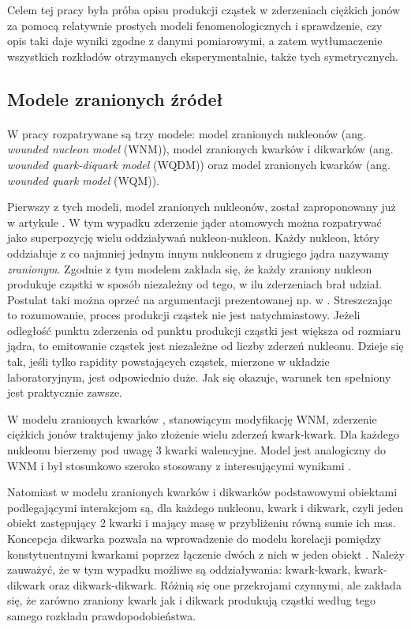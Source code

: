 \documentclass[a4paper,12pt]{article}
\begin{document}
Celem tej pracy była próba opisu produkcji cząstek w zderzeniach ciężkich jonów za pomocą relatywnie prostych modeli fenomenologicznych i sprawdzenie, czy opis taki daje wyniki zgodne z danymi pomiarowymi, a zatem wytłumaczenie wszystkich rozkładów otrzymanych eksperymentalnie, także tych symetrycznych.

\subsection{Modele zranionych źródeł}
\paragraph{}
W pracy rozpatrywane są trzy modele: model zranionych nukleonów (ang. \textit{wounded nucleon model} (WNM)), model zranionych kwarków i dikwarków (ang. \textit{wounded quark-diquark model} (WQDM)) oraz model zranionych kwarków (ang. \textit{wounded quark model} (WQM)). 

Pierwszy z tych modeli, model zranionych nukleonów, został zaproponowany już w artykule \cite{Bialas:1976ed}. W tym wypadku zderzenie jąder atomowych można rozpatrywać jako superpozycję wielu oddziaływań nukleon-nukleon. Każdy nukleon, który oddziałuje z co najmniej jednym innym nukleonem z drugiego jądra nazywamy \textit{zranionym}. Zgodnie z tym modelem zakłada się, że każdy zraniony nukleon produkuje cząstki w sposób niezależny od tego, w ilu zderzeniach brał udział. Postulat taki można oprzeć na argumentacji prezentowanej np. w \cite{Bialas:2007eg}. Streszczając to rozumowanie, proces produkcji cząstek nie jest natychmiastowy. Jeżeli odległość punktu zderzenia od punktu produkcji cząstki jest większa od rozmiaru jądra, to emitowanie cząstek jest niezależne od liczby zderzeń nukleonu. Dzieje się tak, jeśli tylko rapidity powstających cząstek, mierzone w układzie laboratoryjnym, jest odpowiednio duże. Jak się okazuje, warunek ten spełniony jest praktycznie zawsze.

W modelu zranionych kwarków \cite{Bialas:1977en}, stanowiącym modyfikację WNM, zderzenie ciężkich jonów traktujemy jako złożenie wielu zderzeń kwark-kwark. Dla każdego nukleonu bierzemy pod uwagę 3 kwarki walencyjne. Model jest analogiczny do WNM i był stosunkowo szeroko stosowany z interesującymi wynikami \cite{Adler:2013aqf,Adare:2015bua,Bozek:2016kpf,Lacey:2016hqy,Loizides:2016djv,Mitchell:2016jio,Bozek:2017elk,Chaturvedi:2016ctn,Zheng:2016nxx,Rohrmoser:2018shp}.

Natomiast w modelu zranionych kwarków i dikwarków \cite{Bialas:2007eg} podstawowymi obiektami podlegającymi interakcjom są, dla każdego nukleonu, kwark i dikwark, czyli jeden obiekt zastępujący 2 kwarki i mający masę w przybliżeniu równą sumie ich mas. Koncepcja dikwarka pozwala na wprowadzenie do modelu korelacji pomiędzy konstytuentnymi kwarkami poprzez łączenie dwóch z nich w jeden obiekt \cite{Bialas:2006qf}. Należy zauważyć, że w tym wypadku możliwe są oddziaływania: kwark-kwark, kwark-dikwark oraz dikwark-dikwark. Różnią się one przekrojami czynnymi, ale zakłada się, że zarówno zraniony kwark jak i dikwark produkują cząstki według tego samego rozkładu prawdopodobieństwa.
\end{document}
